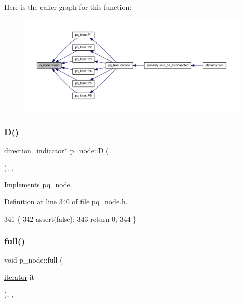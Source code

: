 Here is the caller graph for this function\+:\nopagebreak
\begin{figure}[H]
\begin{center}
\leavevmode
\includegraphics[width=350pt]{classp__node_af24fe11743b0836b03c108a1bf8a0995_icgraph}
\end{center}
\end{figure}
\mbox{\label{classp__node_a1853a9f63b6a81e502db0b3ef5a49ada}} 
\subsubsection{\texorpdfstring{D()}{D()}}
{\footnotesize\ttfamily \mbox{\hyperlink{classdirection__indicator}{direction\+\_\+indicator}}$\ast$ p\+\_\+node\+::D (\begin{DoxyParamCaption}{ }\end{DoxyParamCaption})\hspace{0.3cm}{\ttfamily [inline]}, {\ttfamily [private]}, {\ttfamily [virtual]}}



Implements \mbox{\hyperlink{classpq__node_a5c85bd25c32bb6f18d6d8d1bfd35f260}{pq\+\_\+node}}.



Definition at line 340 of file pq\+\_\+node.\+h.


\begin{DoxyCode}
341     \{
342     assert(\textcolor{keyword}{false});
343     \textcolor{keywordflow}{return} 0;
344     \}
\end{DoxyCode}
\mbox{\label{classp__node_a0ba10aa3a56e26676d78af2e05fb5cd1}} 
\subsubsection{\texorpdfstring{full()}{full()}}
{\footnotesize\ttfamily void p\+\_\+node\+::full (\begin{DoxyParamCaption}\item[{\mbox{\hyperlink{classpq__node_a34898c9eb1527787c07e8ebefd6bfba5}{iterator}}}]{it }\end{DoxyParamCaption})\hspace{0.3cm}{\ttfamily [inline]}, {\ttfamily [private]}, {\ttfamily [virtual]}}



